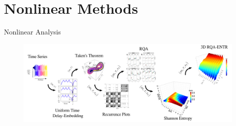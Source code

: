 \section{Nonlinear Methods}

{
\begin{frame}{Nonlinear Analysis}
    \vspace{-00mm}
      \begin{figure}
        \centering
        \includegraphics[width=0.99\linewidth]{./figs/nonlinear-methods/versions/drawing-v00.png}
        \caption{}
      \end{figure}
\end{frame}
}
